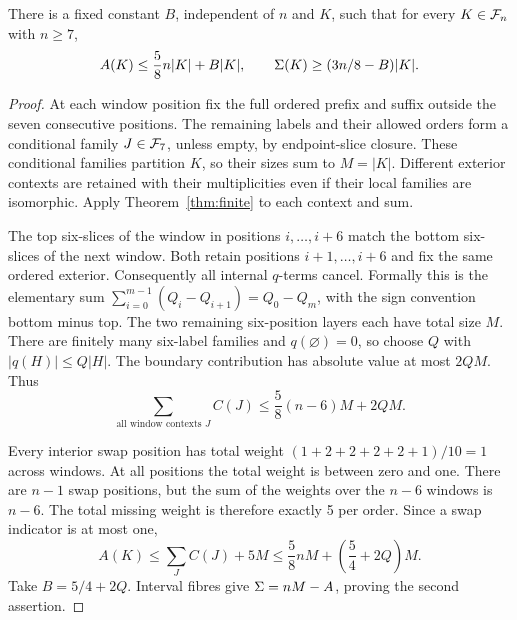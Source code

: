 \begin{proposition}\label{prop:affine}
There is a fixed constant \(B\), independent of \(n\) and \(K\),
such that for every \(K\in\mathcal F_n\) with \(n\geq7\),
\[
 A(K)\leq\frac58n|K|+B|K|,
 \qquad\Sigma(K)\geq(3n/8-B)|K|.
\]
\end{proposition}
\begin{proof}
At each window position fix the full ordered prefix and suffix
outside the seven consecutive positions. The remaining labels and
their allowed orders form a conditional family \(J\in\mathcal F_7\), unless
empty, by endpoint-slice closure. These conditional families partition
\(K\), so their sizes sum to \(M=|K|\). Different exterior contexts
are retained with their multiplicities even if their local families
are isomorphic. Apply Theorem~\ref{thm:finite} to each context and sum.

The top six-slices of the window in positions \(i,\ldots,i+6\)
match the bottom six-slices of the next window. Both retain positions
\(i+1,\ldots,i+6\) and fix the same ordered exterior. Consequently
all internal \(q\)-terms cancel. Formally this is the elementary sum
\(\sum_{i=0}^{m-1}(Q_i-Q_{i+1})=Q_0-Q_m\), with the sign convention
bottom minus top. The two remaining six-position layers each have
total size \(M\). There are finitely many six-label families and
\(q(\varnothing)=0\), so choose \(Q\) with
\(|q(H)|\leq Q|H|\). The boundary contribution has absolute value
at most \(2QM\). Thus
\[
 \sum_{\text{all window contexts }J}C(J)
 \leq\frac58(n-6)M+2QM.
\]

Every interior swap position has total weight
\((1+2+2+2+2+1)/10=1\) across windows. At all positions the total
weight is between zero and one. There are \(n-1\) swap positions,
but the sum of the weights over the \(n-6\) windows is \(n-6\).
The total missing weight is therefore exactly 5 per order. Since a
swap indicator is at most one,
\[
 A(K)\leq\sum_J C(J)+5M
 \leq\frac58nM+\left(\frac54+2Q\right)M.
\]
Take \(B=5/4+2Q\). Interval fibres give \(\Sigma=nM-A\), proving
the second assertion.
\end{proof}
